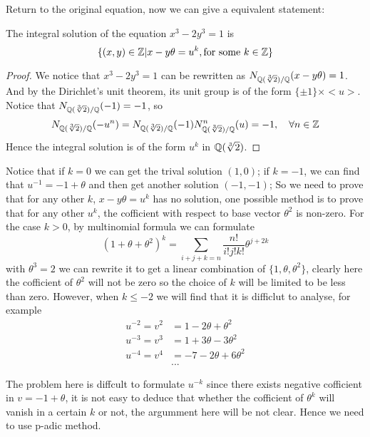 Return to the original equation, now we can give a equivalent statement:
\begin{proposition}
    The integral solution of the equation \(x^3-2y^3=1\) is
    \[\{(x,y)\in \mathbb{Z}| x-y\theta = u^k, \text{for some } k \in \mathbb{Z}\}\]

    \begin{proof}
        We notice that \(x^3-2y^3 = 1 \) can be rewritten as \(N_{\mathbb{Q}(\sqrt[3]{2}) / \mathbb{Q}}(x-y\theta) = 1\). And by the Dirichlet's unit theorem, its unit group is of the form \(\{\pm 1\} \times <u>\). Notice that \(N_{\mathbb{Q}(\sqrt[3]{2}) / \mathbb{Q}}(-1) = -1\), so
        \[N_{\mathbb{Q}(\sqrt[3]{2}) / \mathbb{Q}}(-u^n) = N_{\mathbb{Q}(\sqrt[3]{2}) / \mathbb{Q}}(-1)N_{\mathbb{Q}(\sqrt[3]{2}) / \mathbb{Q}}^n(u) = -1, \quad \forall n \in \mathbb{Z} \]
        Hence the integral solution is of the form \(u^k\) in \(\mathbb{Q}(\sqrt[3]{2})\).
    \end{proof}
\end{proposition}

Notice that if \(k=0\) we can get the trival solution \((1,0)\); if \(k=-1\), we can find that \(u^{-1} = -1 + \theta\) and then get another solution \((-1,-1)\); So we need to prove that for any other \(k\), \(x-y\theta = u^k\) has no solution, one possible method is to prove that for any other \(u^k\), the cofficient with respect to base vector \(\theta^2\) is non-zero. For the case \(k>0\), by multinomial formula we can formulate
\[(1+\theta+ \theta^2)^k = \sum_{i+j+k=n} \frac{n!}{i!j!k!}\theta ^{j+2k}\]
with \(\theta ^3= 2\) we can rewrite it to get a linear combination of \(\{1,\theta,\theta ^2\}\), clearly here the cofficient of \(\theta ^2\) will not be zero so the choice of \(k\) will be limited to be less than zero. However, when \(k\leq -2\) we will find that it is difficlut to analyse, for example
\begin{align*}
    u^{-2} = v^2 &= 1- 2\theta +\theta^2 \\
    u^{-3} = v^3 &= 1+3\theta-3\theta^2 \\
    u^{-4} = v^4 &= -7-2\theta+6\theta^2\\
    &...
\end{align*}
 
The problem here is diffcult to formulate \(u^{-k}\) since there exists negative cofficient in \(v=-1+\theta\), it is not easy to deduce that whether the cofficient of \(\theta^k\) will vanish in a certain \(k\) or not, the argumment here will be not clear. Hence we need to use p-adic method. 
